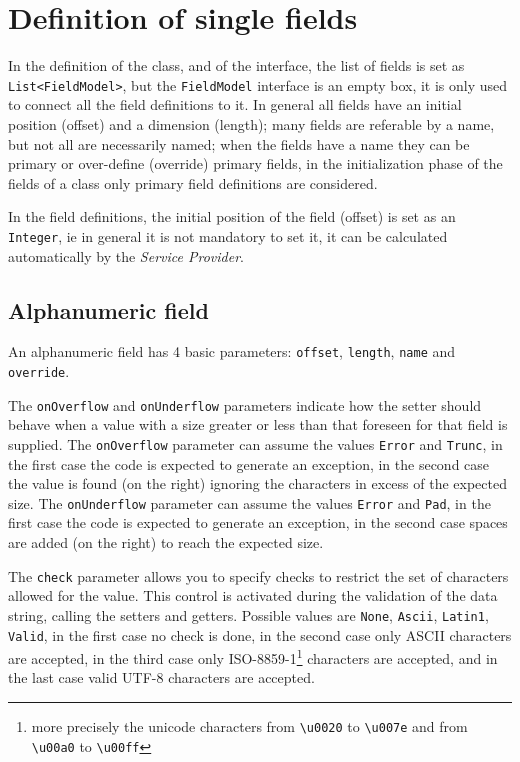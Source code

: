 \documentclass[a4paper,10pt]{report}
\begin{document}
\chapter{Definition of single fields}
In the definition of the class, and of the interface, the list of fields is set 
as \verb!List<FieldModel>!, but the \verb!FieldModel! interface is an empty box, 
it is only used to connect all the field definitions to it.
In general all fields have an initial position (offset) and a dimension 
(length); many fields are referable by a name, but not all are necessarily 
named; when the fields have a name they can be primary or over-define (override) 
primary fields, in the initialization phase of the fields of a class only 
primary field definitions are considered.

In the field definitions, the initial position of the field (offset) is set as 
an \texttt{Integer}, ie in general it is not mandatory to set it, it can be 
calculated automatically by the \textsl{Service Provider}.

\section{Alphanumeric field}
An alphanumeric field has 4 basic parameters: \verb!offset!, \verb!length!, 
\verb!name! and \verb!override!.

The \verb!onOverflow! and \verb!onUnderflow! parameters indicate how the setter 
should behave when a value with a size greater or less than that foreseen for 
that field is supplied. 
The \hypertarget{abc:ovf}{\texttt{onOverflow}} parameter can assume the values 
\verb!Error! and \verb!Trunc!, in the first case the code is expected to 
generate an exception, in the second case the value is found (on the right) 
ignoring the characters in excess of the expected size. 
The \hypertarget{abc:unf}{\texttt{onUnderflow}} parameter can assume the values 
\verb!Error! and \verb!Pad!, in the first case the code is expected to generate 
an exception, in the second case spaces are added (on the right) to reach the 
expected size.

The \hypertarget{abc:chk}{\texttt{check}} parameter allows you to specify checks 
to restrict the set of characters allowed for the value. This control is 
activated during the validation of the data string, calling the setters and 
getters. 
Possible values are \verb!None!, \verb!Ascii!, \verb!Latin1!, \verb!Valid!, in 
the first case no check is done, in the second case only ASCII characters are 
accepted, in the third case only ISO-8859-1\footnote{%
more precisely the unicode characters from \texttt{\textbackslash u0020} to 
\texttt{\textbackslash u007e} and from \texttt{\textbackslash u00a0} to 
\texttt{\textbackslash u00ff}
} characters are accepted, and in the last case valid UTF-8 characters are 
accepted.
\end{document}
